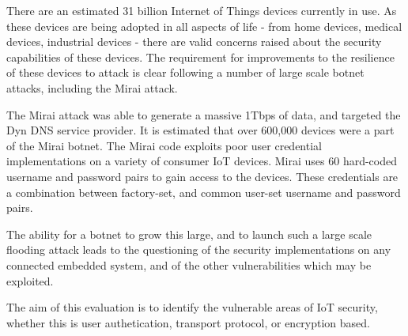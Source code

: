 There are an estimated 31 billion Internet of Things devices currently in use.
As these devices are being adopted in all aspects of life - from home devices,
medical devices, industrial devices - there are valid concerns raised about the
security capabilities of these devices. The requirement for improvements to the
resilience of these devices to attack is clear following a number of large scale
botnet attacks, including the Mirai attack.

The Mirai attack was able to generate a massive 1Tbps of data, and targeted the
Dyn DNS service provider. It is estimated that over 600,000 devices were
a part of the Mirai botnet. The Mirai code exploits poor user credential
implementations on a variety of consumer IoT devices. Mirai uses 60 hard-coded
username and password pairs to gain access to the devices. These credentials are
a combination between factory-set, and common user-set username and password
pairs.

The ability for a botnet to grow this large, and to launch such a large scale
flooding attack leads to the questioning of the security implementations on any
connected embedded system, and of the other vulnerabilities which may be
exploited.

The aim of this evaluation is to identify the vulnerable areas of IoT security,
whether this is user authetication, transport protocol, or encryption based.
